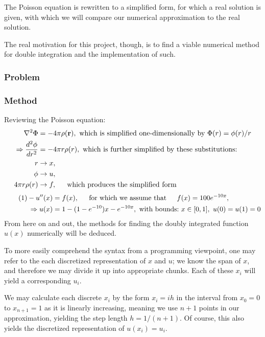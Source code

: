 \documentclass[11pt,a4paper,notitlepage]{article}
\begin{document}
The Poisson equation is rewritten to a simplified form, for which a real solution is given, with which we will compare our numerical approximation to the real solution.

The real motivation for this project, though, is to find a viable numerical method for double integration and the implementation of such.

\subsubsection{Problem}

\subsubsection{Method}
Reviewing the Poisson equation:
\begin{align*}
\nabla ^2 \Phi &= -4\pi\rho(\mathbf{r}), \ \text{which is simplified one-dimensionally by} \ \Phi(r) = \phi(r)/r \\
\Rightarrow \frac{d^2 \phi}{dr^2} &= -4\pi r \rho(r), \ \text{which is further simplified by these substitutions:}\\
r &\rightarrow x, \\
\phi &\rightarrow u,\\
4\pi r\rho(r) &\rightarrow f, \indent \text{which produces the simplified form}
\end{align*}\begin{align*}\label{eq:1}\tag{1}
-u''(x) &= f(x), \indent \text{for which we assume that} \indent f(x) = 100e^{-10x}, \\
\Rightarrow u(x) &= 1- (1-e^{-10})x - e^{-10x},\ \text{with bounds:}\ x \in [0,1],\ u(0) = u(1)= 0
\end{align*}
From here on and out, the methods for finding the doubly integrated function $u(x)$ numerically will be deduced.

To more easily comprehend the syntax from a programming viewpoint, one may refer to the each discretized representation of $x$ and $u$; we know the span of $x$, and therefore we may divide it up into appropriate chunks. Each of these $x_i$ will yield a corresponding $u_i$.

We may calculate each discrete $x_i$ by the form $x_i = ih$ in the interval from $x_0 = 0$ to $x_{n+1} = 1$ as it is linearly increasing, meaning we use $n+1$ points in our approximation, yielding the step length $h = 1/(n+1)$. Of course, this also yields the discretized representation of $u(x_i) = u_i$.
\end{document}
